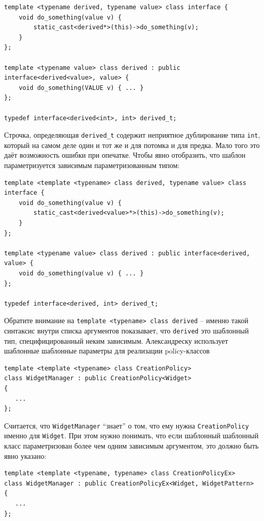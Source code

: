 \documentclass[a4paper,12pt,oneside]{article}
\begin{document}
\begin{lstlisting}
template <typename derived, typename value> class interface {
    void do_something(value v) {
        static_cast<derived*>(this)->do_something(v);
    }
};

template <typename value> class derived : public interface<derived<value>, value> {
    void do_something(VALUE v) { ... }
};

typedef interface<derived<int>, int> derived_t;
\end{lstlisting}

Строчка, определяющая \lstinline!derived_t! содержит неприятное дублирование типа  \lstinline!int!, который на самом деле один и тот же и для потомка и для предка. Мало того это даёт возможность ошибки при опечатке. Чтобы явно отобразить, что шаблон параметризуется зависимым параметризованным типом:

\begin{lstlisting}
template <template <typename> class derived, typename value> class interface {
    void do_something(value v) {
        static_cast<derived<value>*>(this)->do_something(v);
    }
};

template <typename value> class derived : public interface<derived, value> {
    void do_something(value v) { ... }
};

typedef interface<derived, int> derived_t;
\end{lstlisting}

Обратите внимание на \lstinline!template <typename> class derived! -- именно такой синтаксис внутри списка аргументов показывает, что \lstinline!derived! это шаблонный тип, специфицированный неким зависимым. Александреску\cite{mcpp} использует шаблонные шаблонные параметры для реализации policy-классов

\begin{lstlisting}
template <template <typename> class CreationPolicy>
class WidgetManager : public CreationPolicy<Widget>
{
   ...
};
\end{lstlisting}

Считается, что \lstinline!WidgetManager! ``знает'' о том, что ему нужна \lstinline!CreationPolicy! именно для \lstinline!Widget!. При этом нужно понимать, что если шаблонный шаблонный класс параметризован более чем одним зависимым аргументом, это должно быть явно указано:

\begin{lstlisting}
template <template <typename, typename> class CreationPolicyEx>
class WidgetManager : public CreationPolicyEx<Widget, WidgetPattern>
{
   ...
};
\end{lstlisting}
\end{document}
